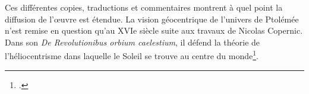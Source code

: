 Ces différentes copies, traductions et commentaires montrent à quel point la diffusion de l'œuvre est étendue. La vision géocentrique de l'univers de Ptolémée n'est remise en question qu'au XVIe siècle suite aux travaux de Nicolas Copernic. Dans son \textit{De Revolutionibus orbium caelestium}, il défend la théorie de l'héliocentrisme dans laquelle le Soleil se trouve au centre du monde\footcite{verdetHELIOCENTRISME2008}. \\

